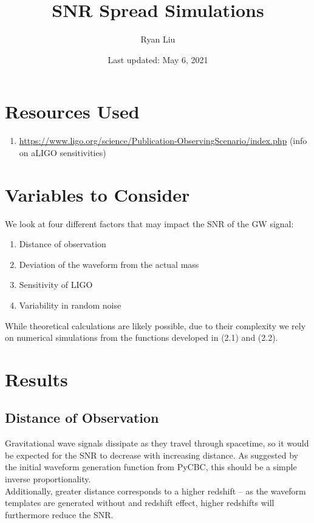 \documentclass{article}
\title{SNR Spread Simulations}
\author{Ryan Liu}
\date{Last updated: May 6, 2021}
\begin{document}
\maketitle

\section{Resources Used}

\begin{enumerate}
    \item \url{https://www.ligo.org/science/Publication-ObservingScenario/index.php} (info on aLIGO sensitivities)
\end{enumerate}

\section{Variables to Consider}

We look at four different factors that may impact the SNR of the GW signal: 
\begin{enumerate}
    \setlength{\itemsep}{0pt}
    \item Distance of observation 
    \item Deviation of the waveform from the actual mass
    \item Sensitivity of LIGO
    \item Variability in random noise
\end{enumerate}
While theoretical calculations are likely possible, due to their complexity we rely on numerical simulations from the functions developed in (2.1) and (2.2). 


\section{Results}


\subsection{Distance of Observation}

Gravitational wave signals dissipate as they travel through spacetime, so it would be expected for the SNR to decrease with increasing distance. As suggested by the initial waveform generation function from PyCBC, this should be a simple inverse proportionality. \\

Additionally, greater distance corresponds to a higher redshift -- as the waveform templates are generated without and redshift effect, higher redshifts will furthermore reduce the SNR. \\
\end{document}
